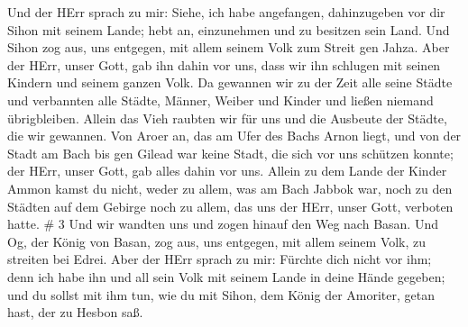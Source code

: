  Und der HErr sprach zu mir: Siehe, ich habe angefangen,
dahinzugeben vor dir Sihon mit seinem Lande; hebt an, einzunehmen und zu
besitzen sein Land.  Und Sihon zog aus, uns entgegen, mit
allem seinem Volk zum Streit gen Jahza.  Aber der HErr,
unser Gott, gab ihn dahin vor uns, dass wir ihn schlugen mit seinen
Kindern und seinem ganzen Volk.  Da gewannen wir zu der
Zeit alle seine Städte und verbannten alle Städte, Männer, Weiber und
Kinder und ließen niemand übrigbleiben.  Allein das Vieh
raubten wir für uns und die Ausbeute der Städte, die wir gewannen.
 Von Aroer an, das am Ufer des Bachs Arnon liegt, und von
der Stadt am Bach bis gen Gilead war keine Stadt, die sich vor uns
schützen konnte; der HErr, unser Gott, gab alles dahin vor uns.
 Allein zu dem Lande der Kinder Ammon kamst du nicht, weder
zu allem, was am Bach Jabbok war, noch zu den Städten auf dem Gebirge
noch zu allem, das uns der HErr, unser Gott, verboten hatte. \# 3
 Und wir wandten uns und zogen hinauf den Weg nach Basan.
Und Og, der König von Basan, zog aus, uns entgegen, mit allem seinem
Volk, zu streiten bei Edrei.  Aber der HErr sprach zu mir:
Fürchte dich nicht vor ihm; denn ich habe ihn und all sein Volk mit
seinem Lande in deine Hände gegeben; und du sollst mit ihm tun, wie du
mit Sihon, dem König der Amoriter, getan hast, der zu Hesbon saß.

